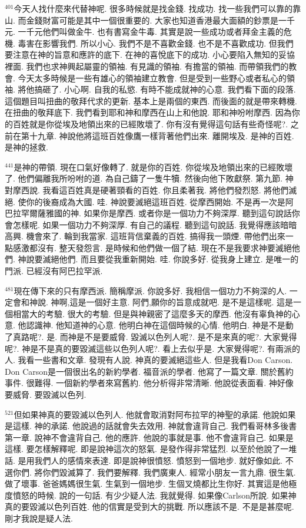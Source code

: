\documentclass{book}
\begin{document}
$^{401}$今天人找什麼來代替神呢.
很多時候就是找金錢.
找成功.
找一些我們可以靠的靠山.
而金錢財富可能是其中一個很重要的.
大家也知道香港最大面額的鈔票是一千元.
一千元他們叫做金牛.
也有書寫金牛毒.
其實是說一些成功或者拜金主義的危機.
毒害在影響我們.
所以小心.
我們不是不喜歡金錢.
也不是不喜歡成功.
但我們要注意在神的旨意和應許的底下.
在神的喜悅底下的成功.
小心要陷入無知的妥協裡面.
我們也求神興起屬靈的領袖.
有見識的領袖.
有擔當的領袖.
而帶領我們的教會.
今天太多時候是一些有雄心的領袖建立教會.
但是受到一些野心或者私心的領袖.
將他搞砸了.
小心啊.
自我的私慾.
有時不能成就神的心意.
我們看下面的段落.
這個題目叫扭曲的敬拜代求的更新.
基本上是兩個的東西.
而後面的就是帶來轉機.
在扭曲的敬拜底下.
我們看到耶和神和摩西在山上和他說.
耶和神吩咐摩西.
因為你的百姓就是你從埃及地領出來的已經敗壞了.
你有沒有覺得這句話有些奇怪呢?.
之前在第十九章.
神說他將這班百姓像鷹一樣背著他們出來.
離開埃及.
是神的百姓.
是神的拯救.

$^{441}$是神的帶領.
現在口氣好像轉了.
就是你的百姓.
你從埃及地領出來的已經敗壞了.
他們偏離我所吩咐的道.
為自己鑄了一隻牛犢.
然後向他下敗獻祭.
第九節.
神對摩西說.
我看這百姓真是硬著頸看的百姓.
你且柔著我.
將他們發烈怒.
將他們滅絕.
使你的後裔成為大國.
哇.
神說要滅絕這班百姓.
從摩西開始.
不是再一次是阿巴拉罕爾薩雅國的神.
如果你是摩西.
或者你是一個功力不夠深厚.
聽到這句說話你會怎樣呢.
如果一個功力不夠深厚.
有自己的議程.
聽到這句說話.
我覺得應該暗暗高興.
機會來了.
輪到我當家.
這班背信棄義的百姓.
搞得我一頭煙.
帶他們出來一點感激都沒有.
整天發怨言.
是時候和他們做一個了結.
現在不是我要求神要滅絕他們.
神說要滅絕他們.
而且要從我重新開始.
哇.
你說多好.
從我身上建立.
是唯一的門派.
已經沒有阿巴拉罕派.

$^{481}$現在傳下來的只有摩西派.
簡稱摩派.
你說多好.
我相信一個功力不夠深的人.
一定會和神說.
神啊,這是一個好主意.
阿們,願你的旨意成就吧.
是不是這樣呢.
這是一個相當大的考驗.
很大的考驗.
但是與神親密了這麼多天的摩西.
他沒有辜負神的心意.
他認識神.
他知道神的心意.
他明白神在這個時候的心情.
他明白.
神是不是動了真路呢?.
是.
而神是不是要威脅.
毀滅以色列人呢?.
是不是來真的呢?.
大家覺得呢?.
神是不是真的要毀滅這些以色列人呢?.
看上去似乎是.
大家覺得呢?.
有兩派的人.
我看一些書和文章.
發現有人說.
神真的要滅絕這些人.
但是我看Don Carson.
Don Carson是一個很出名的新約學者.
福音派的學者.
他寫了一篇文章.
關於舊約事件.
很難得.
一個新約學者來寫舊約.
他分析得非常清晰.
他說從表面看.
神好像要威脅.
要毀滅以色列.

$^{521}$但如果神真的要毀滅以色列人.
他就會取消對阿布拉罕的神聖的承諾.
他說如果是這樣.
神的承諾.
他說過的話就會失去效用.
神就會違背自己.
我們看哥林多後書第一章.
說神不會違背自己.
他的應許.
他說的事就是事.
他不會違背自己.
如果是這樣.
要怎樣解釋呢.
即是說神這次的怒氣.
是發作得非常猛烈.
以至於他說了一堆話.
是用我們人的感情來表達.
即是說神很憤怒.
憤怒到一個地步.
就好像如此.
不選你們.
將你們毀滅算了.
我們要解釋.
我們廣東人.
經常小朋友一言九鼎.
很生氣.
做了壞事.
爸爸媽媽很生氣.
生氣到一個地步.
生個叉燒都比生你好.
其實這是他極度憤怒的時候.
說的一句話.
有少少疑人法.
我就覺得.
如果像Carlson所說.
如果神真的要毀滅以色列百姓.
他的信實是受到大的挑戰.
所以應該不是.
不是是甚麼呢.
剛才我說是疑人法.
\end{document}
